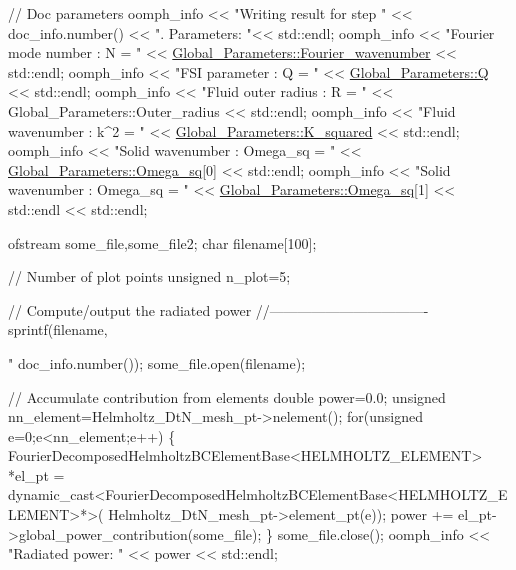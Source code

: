 \begin{DoxyCodeInclude}
{ \textcolor{comment}{// Doc parameters}
 oomph\_info << \textcolor{stringliteral}{"Writing result for step "} << doc\_info.number() 
            << \textcolor{stringliteral}{". Parameters: "}<< std::endl;
 oomph\_info << \textcolor{stringliteral}{"Fourier mode number : N = "}
            << \hyperlink{namespaceGlobal__Parameters_ae1198385d90f52c4ed921520ae43a9e7}{Global\_Parameters::Fourier\_wavenumber} << std::endl;
 oomph\_info << \textcolor{stringliteral}{"FSI parameter : Q = "} << \hyperlink{namespaceGlobal__Parameters_a7814fddf663e56168174a42d2cd6b4c1}{Global\_Parameters::Q} << std::endl;
 oomph\_info << \textcolor{stringliteral}{"Fluid outer radius : R = "} << Global\_Parameters::Outer\_radius
            << std::endl;
 oomph\_info << \textcolor{stringliteral}{"Fluid wavenumber : k^2 = "} << \hyperlink{namespaceGlobal__Parameters_a91a3fa265abaf9e724c668ee800ffb29}{Global\_Parameters::K\_squared}
            << std::endl;
 oomph\_info << \textcolor{stringliteral}{"Solid wavenumber : Omega\_sq = "} 
            << \hyperlink{namespaceGlobal__Parameters_a91314f7f1cc80c43543948568f50f405}{Global\_Parameters::Omega\_sq}[0] << std::endl;
 oomph\_info << \textcolor{stringliteral}{"Solid wavenumber : Omega\_sq = "} 
            << \hyperlink{namespaceGlobal__Parameters_a91314f7f1cc80c43543948568f50f405}{Global\_Parameters::Omega\_sq}[1] 
            << std::endl << std::endl; 


 ofstream some\_file,some\_file2;
 \textcolor{keywordtype}{char} filename[100];

 \textcolor{comment}{// Number of plot points}
 \textcolor{keywordtype}{unsigned} n\_plot=5; 

 \textcolor{comment}{// Compute/output the radiated power}
 \textcolor{comment}{//----------------------------------}
 sprintf(filename,\textcolor{stringliteral}{"%
         doc\_info.number());
 some\_file.open(filename);

 \textcolor{comment}{// Accumulate contribution from elements}
 \textcolor{keywordtype}{double} power=0.0;
 \textcolor{keywordtype}{unsigned} nn\_element=Helmholtz\_DtN\_mesh\_pt->nelement(); 
 \textcolor{keywordflow}{for}(\textcolor{keywordtype}{unsigned} e=0;e<nn\_element;e++)
  \{
   FourierDecomposedHelmholtzBCElementBase<HELMHOLTZ\_ELEMENT> *el\_pt = 
    \textcolor{keyword}{dynamic\_cast<}FourierDecomposedHelmholtzBCElementBase<HELMHOLTZ\_ELEMENT>*\textcolor{keyword}{>}(
     Helmholtz\_DtN\_mesh\_pt->element\_pt(e)); 
   power += el\_pt->global\_power\_contribution(some\_file);
  \}
 some\_file.close();
 oomph\_info << \textcolor{stringliteral}{"Radiated power: "} << power << std::endl;

}}
\end{DoxyCodeInclude}
